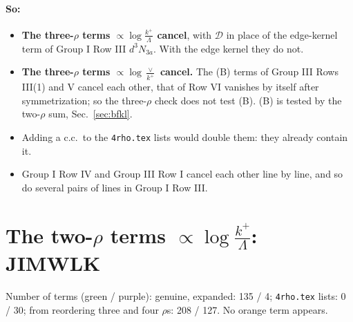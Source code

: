 \documentclass[10pt]{article}
\numberwithin{equation}{section}
\begin{document}
\paragraph{So:}
\begin{itemize}
\item \textbf{The three-$\rho$ terms $\propto\log\frac{k^+}{\Lambda}$ cancel}, with $\mathcal D$ in place of the edge-kernel term of Group I Row III $d^3N_{3a}$. With the edge kernel they do not.
\item \textbf{The three-$\rho$ terms $\propto\log\frac{\vee}{k^+}$ cancel.} The (B) terms of Group III Rows III(1) and V cancel each other, that of Row VI vanishes by itself after symmetrization; so the three-$\rho$ check does not test (B). (B) is tested by the two-$\rho$ sum, Sec.~\ref{sec:bfkl}.
\item Adding a c.c.\ to the \texttt{4rho.tex} lists would double them: they already contain it.
\item Group I Row IV and Group III Row I cancel each other line by line, and so do several pairs of lines in Group I Row III.
\end{itemize}

\section{The two-$\rho$ terms $\propto\log\frac{k^+}{\Lambda}$: JIMWLK}\label{sec:two}
Number of terms (green / purple): genuine, expanded: 135 / 4; \texttt{4rho.tex} lists: 0 / 30; from reordering three and four $\rho$\textquotesingle s: 208 / 127. No orange term appears.
\end{document}

